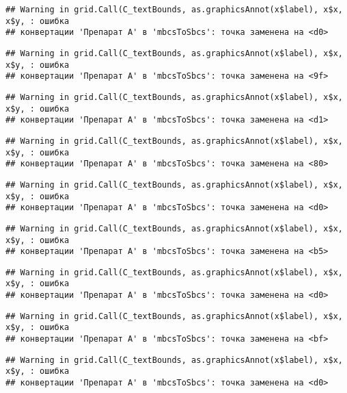 \documentclass[
]{article}
\begin{document}
\begin{verbatim}
## Warning in grid.Call(C_textBounds, as.graphicsAnnot(x$label), x$x, x$y, : ошибка
## конвертации 'Препарат A' в 'mbcsToSbcs': точка заменена на <d0>
\end{verbatim}

\begin{verbatim}
## Warning in grid.Call(C_textBounds, as.graphicsAnnot(x$label), x$x, x$y, : ошибка
## конвертации 'Препарат A' в 'mbcsToSbcs': точка заменена на <9f>
\end{verbatim}

\begin{verbatim}
## Warning in grid.Call(C_textBounds, as.graphicsAnnot(x$label), x$x, x$y, : ошибка
## конвертации 'Препарат A' в 'mbcsToSbcs': точка заменена на <d1>
\end{verbatim}

\begin{verbatim}
## Warning in grid.Call(C_textBounds, as.graphicsAnnot(x$label), x$x, x$y, : ошибка
## конвертации 'Препарат A' в 'mbcsToSbcs': точка заменена на <80>
\end{verbatim}

\begin{verbatim}
## Warning in grid.Call(C_textBounds, as.graphicsAnnot(x$label), x$x, x$y, : ошибка
## конвертации 'Препарат A' в 'mbcsToSbcs': точка заменена на <d0>
\end{verbatim}

\begin{verbatim}
## Warning in grid.Call(C_textBounds, as.graphicsAnnot(x$label), x$x, x$y, : ошибка
## конвертации 'Препарат A' в 'mbcsToSbcs': точка заменена на <b5>
\end{verbatim}

\begin{verbatim}
## Warning in grid.Call(C_textBounds, as.graphicsAnnot(x$label), x$x, x$y, : ошибка
## конвертации 'Препарат A' в 'mbcsToSbcs': точка заменена на <d0>
\end{verbatim}

\begin{verbatim}
## Warning in grid.Call(C_textBounds, as.graphicsAnnot(x$label), x$x, x$y, : ошибка
## конвертации 'Препарат A' в 'mbcsToSbcs': точка заменена на <bf>
\end{verbatim}

\begin{verbatim}
## Warning in grid.Call(C_textBounds, as.graphicsAnnot(x$label), x$x, x$y, : ошибка
## конвертации 'Препарат A' в 'mbcsToSbcs': точка заменена на <d0>
\end{verbatim}
\end{document}
